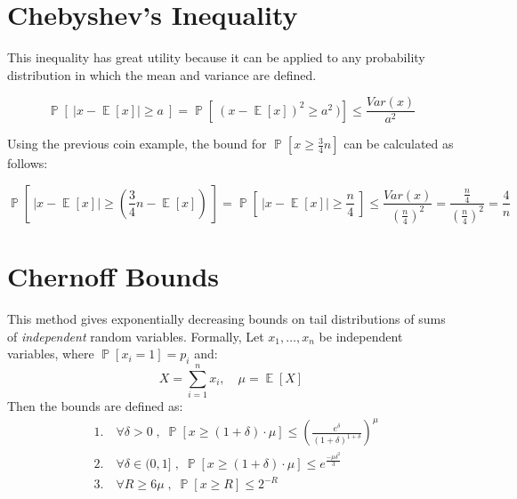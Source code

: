 \documentclass[twoside]{article}
\def\beginrefs{\begin{list}%
        {[\arabic{equation}]}{\usecounter{equation}
         \setlength{\leftmargin}{2.0truecm}\setlength{\labelsep}{0.4truecm}%
         \setlength{\labelwidth}{1.6truecm}}}
\def\endrefs{\end{list}}
\def\bibentry#1{\item[\hbox{[#1]}]}
\DeclareMathOperator{\E}{\mathbb{E}}
\DeclareMathOperator{\Prob}{\mathbb{P}}
\begin{document}
\section{Chebyshev's Inequality}
This inequality has great utility because it can be applied to any probability distribution in which the mean and variance are defined.


\[\Prob[\:|x-\E[x]|\geq a\:] = \Prob[\:(x-\E[x])^2 \geq a^2\:)]	 \leq \frac{Var(x)}{a^2} \]

Using the previous coin example, the bound for $\Prob[x\geq \frac{3}{4}n]$ can be calculated as follows:


\[\Prob[\:|x-\E[x]| \geq (\frac{3}{4} n-\E[x])\:] = \Prob[\:|x-\E[x]| \geq \frac{n}{4}\:] \leq \frac{Var(x)}{(\frac{n}{4})^2} = \frac{\frac{n}{4}}{(\frac{n}{4})^2} = \frac{4}{n} \]

\section{Chernoff Bounds}
This method gives exponentially decreasing bounds on tail distributions of sums of {\em independent} random variables. Formally, Let $x_1,\ldots,x_n$ be independent variables, where $\Prob[x_i=1]=p_i$ and:
\[ X = \sum_{i=1}^{n} x_i, \quad \mu = \E[X] \]
Then the bounds are defined as:
\begin{align*} 
&1.\quad\forall \delta > 0\;,\; \Prob[x\geq (1+\delta)\cdot\mu] \leq
 \left(  \frac{e^\delta}{(1+\delta)^{1+\delta}} \right)^\mu \\
&2.\quad\forall \delta \in (0,1]\;,\; \Prob[x\geq (1+\delta)\cdot\mu] \leq
 e^\frac{-\mu\delta^2}{3} \\
&3.\quad\forall R\geq 6\mu\;,\; \Prob[x\geq R] \leq 2^{-R}
\end{align*} 

\end{document}
